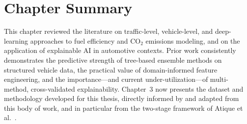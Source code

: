 \section{Chapter Summary}

This chapter reviewed the literature on traffic-level, vehicle-level, and deep-learning approaches to fuel efficiency and CO$_2$ emissions modeling, and on the application of explainable AI in automotive contexts. Prior work consistently demonstrates the predictive strength of tree-based ensemble methods on structured vehicle data, the practical value of domain-informed feature engineering, and the importance---and current under-utilization---of multi-method, cross-validated explainability. Chapter~3 now presents the dataset and methodology developed for this thesis, directly informed by and adapted from this body of work, and in particular from the two-stage framework of Atique et al.~\cite{atique2026explainable}.